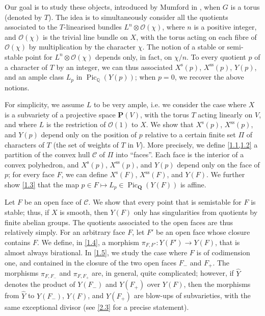\documentclass{article}
\theoremstyle{plain}
\theoremstyle{definition}
\newcommand{\sh}[1]{{\mathscr{#1}}}
\newcommand{\PP}{\mathbf{P}}
\newcommand{\QQ}{\mathbf{Q}}
\newcommand{\s}{\mathrm{s}}
\renewcommand{\ss}{\mathrm{ss}}
\DeclareMathOperator{\Pic}{Pic}
\newcommand{\oldpage}[1]{\marginpar{\footnotesize$\Big\vert$ \textit{p.~#1}}}
\begin{document}
Our goal is to study these objects, introduced by Mumford in \cite{MF}, when $G$ is a torus (denoted by $T$).
The idea is to simultaneously consider all the quotients associated to the $T$-linearised bundles $L^n\otimes\sh{O}(\chi)$, where $n$ is a positive integer, and $\sh{O}(\chi)$ is the trivial line bundle on $X$, with the torus acting on each fibre of $\sh{O}(\chi)$ by multiplication by the character $\chi$.
The notion of a stable or semi-stable point for $L^n\otimes\sh{O}(\chi)$ depends only, in fact, on $\chi/n$.
\oldpage{510}
To every quotient $p$ of a character of $T$ by an integer, we can thus associated $X^\s(p)$, $X^\ss(p)$, $Y(p)$, and an ample class $L_p$ in $\Pic_\mathbb{Q}(Y(p))$;
when $p=0$, we recover the above notions.

For simplicity, we assume $L$ to be very ample, i.e. we consider the case where $X$ is a subvariety of a projective space $\PP(V)$, with the torus $T$ acting linearly on $V$, and where $L$ is the restriction of $\sh{O}(1)$ to $X$.
We show that $X^\s(p)$, $X^\ss(p)$, and $Y(p)$ depend only on the position of $p$ relative to a certain finite set $\Pi$ of characters of $T$ (the set of weights of $T$ in $V$).
More precisely, we define \cref{1.1,1.2} a partition of the convex hull $\mathcal{C}$ of $\Pi$ into ``faces''.
Each face is the interior of a convex polyhedron, and $X^\s(p)$, $X^\ss(p)$, and $Y(p)$ depend only on the face of $p$;
for every face $F$, we can define $X^\s(F)$, $X^\ss(F)$, and $Y(F)$.
We further show \cref{1.3} that the map $p\in F\mapsto L_p\in\Pic_\QQ(Y(F))$ is affine.

Let $F$ be an open face of $\mathcal{C}$.
We show that every point that is semistable for $F$ is stable;
thus, if $X$ is smooth, then $Y(F)$ only has singularities from quotients by finite abelian groups.
The quotients associated to the open faces are thus relatively simply.
For an arbitrary face $F$, let $F'$ be an open face whose closure contains $F$.
We define, in \cref{1.4}, a morphism $\pi_{F,F'}\colon Y(F')\to Y(F)$, that is almost always birational.
In \cref{1.5}, we study the case where $F$ is of codimension one, and contained in the closure of the two open faces $F_-$ and $F_+$.
The morphisms $\pi_{F,F_-}$ and $\pi_{F,F_+}$ are, in general, quite complicated;
however, if $\hat{Y}$ denotes the product of $Y(F_-)$ and $Y(F_+)$ over $Y(F)$, then the morphisms from $\hat{Y}$ to $Y(F_-)$, $Y(F)$, and $Y(F_+)$ are blow-ups of subvarieties, with the same exceptional divisor (see \cref{2.3} for a precise statement).
\end{document}
